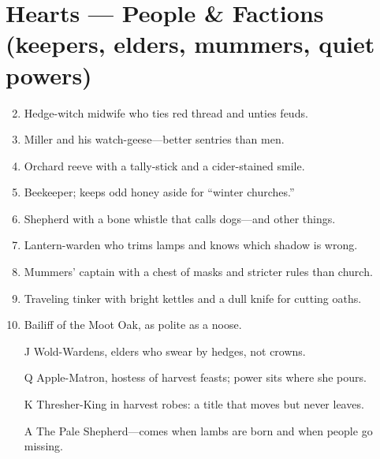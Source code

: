 \section*{Hearts --- People \& Factions (keepers, elders, mummers, quiet powers)}
\begin{enumerate}
\setcounter{enumi}{1}
\item Hedge-witch midwife who ties red thread and unties feuds.
\item Miller and his watch-geese---better sentries than men.
\item Orchard reeve with a tally-stick and a cider-stained smile.
\item Beekeeper; keeps odd honey aside for ``winter churches.''
\item Shepherd with a bone whistle that calls dogs---and other things.
\item Lantern-warden who trims lamps and knows which shadow is wrong.
\item Mummers' captain with a chest of masks and stricter rules than church.
\item Traveling tinker with bright kettles and a dull knife for cutting oaths.
\item Bailiff of the Moot Oak, as polite as a noose.
\item[J] Wold-Wardens, elders who swear by hedges, not crowns.
\item[Q] Apple-Matron, hostess of harvest feasts; power sits where she pours.
\item[K] Thresher-King in harvest robes: a title that moves but never leaves.
\item[A] The Pale Shepherd---comes when lambs are born and when people go missing.
\end{enumerate}

